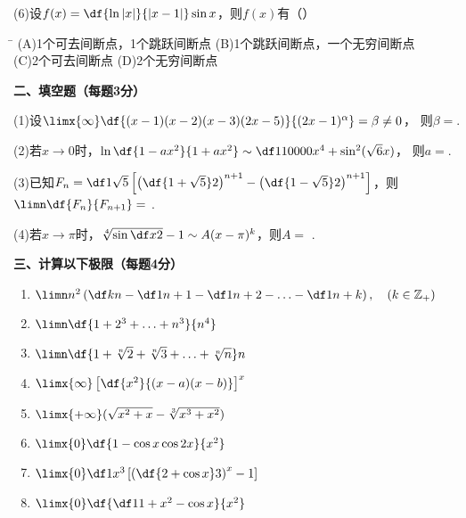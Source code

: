 (6)\;设$f(x)=\df{\ln|x|}{|x-1|}\sin x$，则$f(x)$有（\quad）%

\begin{tabbing}
	\hspace{8cm}\=\kill
	\quad\quad\quad(A)\;1个可去间断点，1个跳跃间断点 
	\> (B)\;1个跳跃间断点，一个无穷间断点 \\ 
	\quad\quad\quad(C)\;2个可去间断点
	\>	(D)\;2个无穷间断点 
\end{tabbing}

{\bf 二、填空题（每题3分）}

(1)\;设$\limx{\infty}\df{(x-1)(x-2)(x-3)(2x-5)}{(2x-1)^{\alpha}}=\beta\ne 0$，
则$\beta=$\underline{\hspace{4cm}}.

(2)\;若$x\to0$时，$\ln\df{1-ax^2}{1+ax^2}\sim\df1{10000}x^4+\sin^2(\sqrt6x)$，
则$a=$\underline{\hspace{4cm}}.

(3)\;已知$F_n=\df1{\sqrt5}\left[\left(\df{1+\sqrt5}2\right)^{n+1}
-\left(\df{1-\sqrt5}2\right)^{n+1}\right]$，则$\limn\df{F_n}{F_{n+1}}=$
\underline{\hspace{4cm}}.

(4)\;若$x\to\pi$时，$\sqrt[4]{\sin\df x2}-1\sim A(x-\pi)^k$，则$A=$
\underline{\hspace{4cm}}.

\bigskip

{\bf 三、计算以下极限（每题4分）}
\begin{enumerate}[(1)]
  \setlength{\itemindent}{1cm}
  \item $\limn n^2\left(\df
  kn-\df1{n+1}-\df1{n+2}-\ldots-\df1{n+k}\right),\quad(k\in\mathbb{Z}_+)$
  \item $\limn\df{1+2^3+\ldots+n^3}{n^4}$
  \item $\limn\df{1+\sqrt[n]2+\sqrt[n]3+\ldots+\sqrt[n]n}n$
  \item $\limx{\infty}\left[\df{x^2}{(x-a)(x-b)}\right]^x$
  \item $\limx{+\infty}(\sqrt{x^2+x}-\sqrt[3]{x^3+x^2})$ 
  \item $\limx{0}\df{1-\cos x\cos 2x}{x^2}$
  \item $\limx{0}\df1{x^3}\left[\left(\df{2+\cos x}3\right)^x-1\right]$
  \item $\limx{0}\df{\df1{1+x^2}-\cos x}{x^2}$
\end{enumerate}

